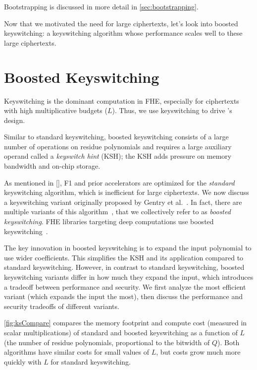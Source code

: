Bootstrapping is discussed in more detail in \autoref{sec:bootstrapping}.

Now that we motivated the need for large ciphertexts, let's look into boosted
keyswitching: a keyswitching algorithm whose performance scales well to these large
ciphertexts.

\section{Boosted Keyswitching}\label{sec:keyswitching}

Keyswitching is the dominant computation in FHE, especially for ciphertexts
with high multiplicative budgets ($L$). Thus, we use keyswitching to drive
\name's design.

Similar to standard keyswitching, boosted keyswitching consists of a large
number of operations on residue polynomials and requires a large auxiliary
operand called a  \emph{keyswitch hint} (KSH); the KSH adds pressure on memory
bandwidth and on-chip storage.

\figKScompare

As mentioned in \autoref{}, F1 and prior accelerators are optimized for the
\emph{standard} keyswitching algorithm, which is inefficient for large
ciphertexts. We now discuss a keyswitching variant originally proposed by
Gentry et al.~\cite[Section 3.1]{gentry:crypto2012:homomorphic}. In fact, there
are multiple variants of this algorithm~\cite[Section 5.3.4]{halevi2020helib},
that we collectively refer to as \emph{boosted keyswitching}. FHE libraries
targeting deep computations use boosted
keyswitching~\cite{gentry:crypto2012:homomorphic,halevi2020helib,heaan,mouchet2020lattigo}.

The key innovation in boosted keyswitching is to expand the input polynomial to
use wider coefficients. This simplifies the KSH and its application compared to
standard keyswitching. However, in contrast to standard keyswitching, boosted
keyswitching variants differ in how much they expand the input, which
introduces a tradeoff between performance and security. We first analyze the
most efficient variant (which expands the input the most), then discuss the
performance and security tradeoffs of different variants.

\autoref{fig:ksCompare} compares the memory footprint and compute cost
(measured in scalar multiplications) of standard and boosted keyswitching as a
function of $L$ (the number of residue polynomials, proportional to the
bitwidth of $Q$). Both algorithms have similar costs for small values of $L$,
but costs grow much more quickly with $L$ for standard keyswitching.

